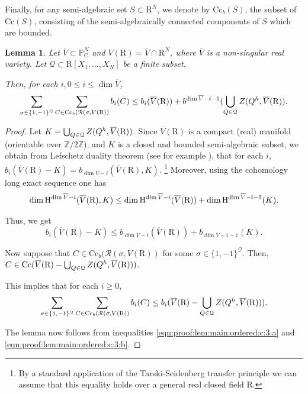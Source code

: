 \documentclass[10pt]{amsart}
\newtheorem{lemma}{Lemma}[section]
\theoremstyle{definition}
\theoremstyle{remark}
\numberwithin{equation}{section}
\newcommand {\R} {\mathrm{R}}
\newcommand {\C}     {\mathrm{C}}
\newcommand {\ZZ} {{\rm Z}}
\newcommand {\RR} {{\mathcal R}}
\newcommand {\PP}     {\mathbb{P}} %
\newcommand{\HH}  {\mbox{\rm H}}
\newcommand{\Cc}{\mathrm{Cc}}
\begin{document}
Finally, for any semi-algebraic set $S \subset \R^N$, we denote by $\Cc_b(S)$, the subset of $\Cc(S)$, consisting of the semi-algebraically connected components of $S$ which are bounded.

\begin{lemma}
\label{lem:main:ordered:c:3}
    Let $\overline{V} \subset \PP_\C^N$ and 
    $V(\R)  = \overline{V} \cap \R^N$, where
    $\overline{V}$ is a non-singular real variety. Let
    $\mathcal{Q} \subset \R[X_1,\ldots,X_N]$ be a finite subset.

    Then, for each $i, 0 \leq i \leq \dim \overline{V}$,
    \[
        \sum_{\sigma \in \{1,-1\}^{\mathcal{Q}}} 
        \sum_{C \in \Cc_b(\RR(\sigma,V(\R))} b_i(C) \leq
        b_i(\overline{V}(\R)) + b^{\dim \overline{V}- i -1}(\bigcup_{Q \in \mathcal{Q}} \ZZ(Q^h,\overline{V}(\R)).
    \]
\end{lemma}

\begin{proof}
    Let $K = \bigcup_{Q \in \mathcal{Q}} \ZZ(Q^h,\overline{V}(\R))$.
   Since $\overline{V}(\R)$ is a compact (real) manifold (orientable over $\mathbb{Z}/2\mathbb{Z}$), 
   and $K$ is a closed and bounded semi-algebraic subset, we obtain from 
   Lefschetz duality theorem (see for example \cite[page 297, Theorem 18]{Spanier}),
   that for each $i$,
   $b_i(\overline{V}(\R) - K) = b_{\dim \overline{V} - i}(\overline{V}(\R),K)$.
   \footnote{By a standard application of the Tarski-Seidenberg transfer principle we can assume that this equality holds over a general real closed field $\R$.}
   Moreover, using the cohomology long exact sequence one has
   \[
    \dim \HH^{\dim \overline{V} - i}(\overline{V}(\R),K) \leq 
    \dim \HH^{\dim \overline{V} - i}(\overline{V}(\R)) + \dim \HH^{\dim \overline{V} - i-1}(K).
   \]
   
   Thus,  we get
   \begin{equation}
   \label{eqn:proof:lem:main:ordered:c:3:a}
     b_i(\overline{V}(\R) - K) \leq  b_{\dim \overline{V} - i}(\overline{V}(\R)) + b_{\dim \overline{V} - i-1}(K).  
   \end{equation}
    
   
   Now suppose that $C \in \Cc_b(\RR(\sigma,V(\R))$ for some 
   $\sigma \in \{1,-1\}^{\mathcal{Q}}$. 
   Then, 
   $C \in \Cc(\overline{V}(\R) - \bigcup_{Q \in \mathcal{Q}} \ZZ(Q^h,\overline{V}(\R)))$.

    This implies that for each $i \geq 0$,
    \begin{equation}
    \label{eqn:proof:lem:main:ordered:c:3:b}
\sum_{\sigma \in \{1,-1\}^{\mathcal{Q}}} 
        \sum_{C \in \Cc_b(\RR(\sigma,V(\R))} b_i(C) 
        \leq 
        b_i(\overline{V}(\R) - \bigcup_{Q \in \mathcal{Q}} \ZZ(Q^h,\overline{V}(\R))).
    \end{equation}

   The lemma now follows from inequalities \eqref{eqn:proof:lem:main:ordered:c:3:a} and
   \eqref{eqn:proof:lem:main:ordered:c:3:b}.
\end{proof}
\end{document}
